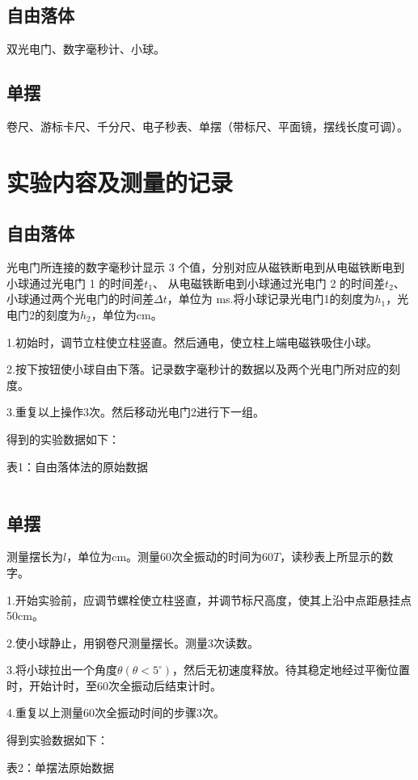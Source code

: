 \documentclass[11pt]{article}
\begin{document}
\subsection{自由落体}
双光电门、数字毫秒计、小球。
\subsection{单摆}
卷尺、游标卡尺、千分尺、电子秒表、单摆（带标尺、平面镜，摆线长度可调）。
\section{实验内容及测量的记录}
\subsection{自由落体}
光电门所连接的数字毫秒计显示 3 个值，分别对应从磁铁断电到从电磁铁断电到小球通过光电门 1 的时间差$ t_1 $、 从电磁铁断电到小球通过光电门 2 的时间差$ t_2 $、小球通过两个光电门的时间差$ \Delta t $，单位为 ms.将小球记录光电门1的刻度为$ h_1 $，光电门2的刻度为$ h_2 $，单位为cm。

1.初始时，调节立柱使立柱竖直。然后通电，使立柱上端电磁铁吸住小球。

2.按下按钮使小球自由下落。记录数字毫秒计的数据以及两个光电门所对应的刻度。

3.重复以上操作3次。然后移动光电门2进行下一组。

得到的实验数据如下：
\begin{center}
	表1：自由落体法的原始数据
			\begin{tabular}{|c|c|c|c|c|c|c|c|c|c|ccc}
			\hline
		\end{tabular}
\end{center}

\subsection{单摆}
测量摆长为$ l $，单位为cm。测量60次全振动的时间为$ 60T $，读秒表上所显示的数字。

1.开始实验前，应调节螺栓使立柱竖直，并调节标尺高度，使其上沿中点距悬挂点 50cm。

2.使小球静止，用钢卷尺测量摆长。测量3次读数。

3.将小球拉出一个角度$ \theta(\theta <5^\circ) $，然后无初速度释放。待其稳定地经过平衡位置时，开始计时，至60次全振动后结束计时。

4.重复以上测量60次全振动时间的步骤3次。

得到实验数据如下：
\begin{center}
	表2：单摆法原始数据
		\begin{tabular}{|c|c|c|c|}
			\hline
		\end{tabular}
\end{center}
\end{document}
